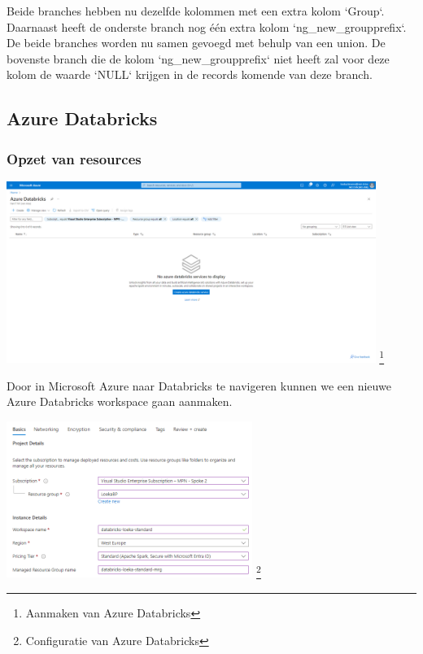Beide branches hebben nu dezelfde kolommen met een extra kolom `Group`. Daarnaast heeft de onderste branch nog één extra kolom `ng\_new\_groupprefix`. De beide branches worden nu samen gevoegd met behulp van een union. De bovenste branch die de kolom `ng\_new\_groupprefix` niet heeft zal voor deze kolom de waarde `NULL` krijgen in de records komende van deze branch. 


\subsection{Azure Databricks}

\subsubsection{Opzet van resources}

\begin{center}
    \includegraphics[width=0.9\textwidth]{./graphics/databricks/initial_1.png}
    \footnote{Aanmaken van Azure Databricks}
\end{center}

Door in Microsoft Azure naar Databricks te navigeren kunnen we een nieuwe Azure Databricks workspace gaan aanmaken.

\begin{center}
    \includegraphics[width=0.6\textwidth]{./graphics/databricks/initial_2.png}
    \footnote{Configuratie van Azure Databricks}
\end{center}

